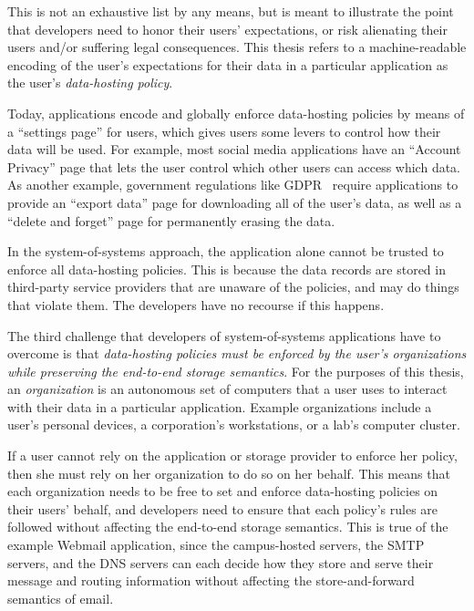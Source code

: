 This is not an exhaustive list by any means, but is meant to illustrate the point
that developers need to honor their users' expectations, or risk alienating
their users and/or suffering legal consequences.  This thesis
refers to a machine-readable encoding of the user's expectations for their data
in a particular application as the user's \emph{data-hosting policy}.

Today, applications encode and globally enforce data-hosting policies by means of
a ``settings page'' for users, which gives users some levers to control how
their data will be used.  For example, most social media applications have an
``Account Privacy'' page that lets the user control which other users can access
which data.  As another example, government regulations like
GDPR~\cite{gdpr} require applications to provide an ``export data'' page for
downloading all of the user's data, as well as a ``delete and forget'' page for
permanently erasing the data.

In the system-of-systems approach, the application alone cannot be trusted to
enforce all data-hosting policies.  This is because the data records are stored in
third-party service providers that are unaware of the policies, and may
do things that violate them.  The developers have no recourse if this happens.

The third challenge that developers of system-of-systems applications have to overcome is
that \emph{data-hosting policies must be enforced by the user's
organizations while preserving the end-to-end storage semantics}.
For the purposes of this thesis, an \emph{organization} is an
autonomous set of computers that a user uses to interact with their data 
in a particular application.  Example organizations include a
user's personal devices, a corporation's workstations, or a lab's
computer cluster. 

If a user cannot rely on the application or storage provider
to enforce her policy, then she must rely on her organization to do so on her behalf.
This means that each organization needs to be free to
set and enforce data-hosting policies on their users' behalf,
and developers need to ensure that each policy's
rules are followed without affecting the end-to-end storage semantics.
This is true of the example Webmail application, since the campus-hosted
servers, the SMTP servers, and the DNS servers can each
decide how they store and serve their message and routing information
without affecting the store-and-forward semantics of email.

